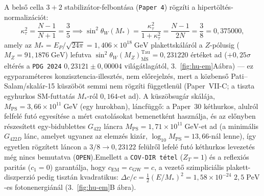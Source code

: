 \documentclass[11pt,a4paper]{article}
\begin{document}
A belső cella $3+2$ stabilizátor-felbontása (\texttt{Paper 4}) rögzíti a hipertöltés-normalizációt:
\begin{equation}
\kappa_\tau^2 = \frac{N-1}{N+1} = \frac{3}{5} \implies \sin^2\theta_W(M_*) = \frac{\kappa_\tau^2}{1+\kappa_\tau^2} = \frac{N-1}{2N} = \frac{3}{8} = 0{,}375000,
\end{equation}
amely az $M_* = E_P/\sqrt{24\pi} = 1{,}406\times 10^{18}\;\mathrm{GeV}$ plakettskáláról a $Z$-pólusig ($M_Z=91{,}1876\;\mathrm{GeV}$) lefutva $\sin^2\theta_W(M_Z)_{\overline{\mathrm{MS}}}^{\mathrm{Tau}} = 0{,}231220$ értéket ad ($+0{,}25\sigma$ eltérés a \texttt{PDG 2024} $0{,}23121\pm 0{,}00004$ világátlagától, 3.~\ref{fig:hu-em}Aábra) --- ez egyparam\'eteres konzisztencia-illeszt\'es, nem el\H{o}rejelz\'es, mert a k\"ozbens\H{o} Pati--Salam/\allowbreak skal\'ar-15 k\"usz\"ob\"ot semmi nem r\"ogz\'iti f\"uggetlen\"ul (Paper~VII-C; a tiszta egyhurkos SM-futtat\'as $M_*$-r\'ol $0{,}164$-et ad). A k\"usz\"obsug\'ar sk\'al\'aja, $M_{\mathrm{PS}} = 3{,}66\times 10^{11}\;\mathrm{GeV}$ (egy hurokban), l\'ancf\"ugg\H{o}: a Paper~30 k\'ethurkos, alulr\'ol felfel\'e fut\'o egyes\'it\'ese a m\'ert csatol\'asokat bemenetk\'ent haszn\'alja, \'es az el\H{o}nyben r\'eszes\'itett egy-bidublettes $G_{422}$ l\'ancra $M_{\mathrm{PS}} = 1{,}71\times 10^{11}\;\mathrm{GeV}$-et ad (a minim\'alis $G_{422D}$ l\'anc, amelyet ugyanez az elemz\'es kiz\'ar, $\log_{10}M_{\mathrm{PS}} = 13{,}66$-n\'al lenne), \'igy egyetlen r\"ogz\'itett l\'ancon a $3/8 \to 0{,}23122$ fel\"ulr\H{o}l lefel\'e fut\'o k\'ethurkos levezet\'es m\'eg nincs bemutatva (\texttt{OPEN}).Emellett a \texttt{COV-DIR tétel} ($Z_T=1$) és a reflexiós paritás ($c_1=0$) garantálja, hogy $c_{\mathrm{EM}}=c_{\mathrm{GW}}=c$, a vezető szimpliciális plakett-diszperzió pedig tisztán kvadratikus: $\Delta c/c = \frac{1}{2}(E/M_*)^2 = 1{,}58\times 10^{-24}$ $2{,}5\;\mathrm{PeV}$-es fotonenergiánál (3.~\ref{fig:hu-em}B ábra).
\end{document}
